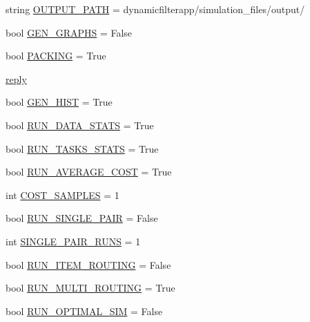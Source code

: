 \begin{DoxyCompactItemize}
string \mbox{\hyperlink{namespacedynamicfilterapp_1_1toggles_a04644ded1d5e3fc8bd58a411209b7886}{O\+U\+T\+P\+U\+T\+\_\+\+P\+A\+TH}} = \textquotesingle{}dynamicfilterapp/simulation\+\_\+files/output/\textquotesingle{}
\item 
bool \mbox{\hyperlink{namespacedynamicfilterapp_1_1toggles_a57c1e3f291181d680f3ee118fa5c4ab8}{G\+E\+N\+\_\+\+G\+R\+A\+P\+HS}} = False
\item 
bool \mbox{\hyperlink{namespacedynamicfilterapp_1_1toggles_a23735ccf05ebd9212e9ebaab8f652507}{P\+A\+C\+K\+I\+NG}} = True
\item 
\mbox{\hyperlink{namespacedynamicfilterapp_1_1toggles_a496267841b3ab9e872499fd2731736ff}{reply}}
\item 
bool \mbox{\hyperlink{namespacedynamicfilterapp_1_1toggles_a242327c0cdef5981d6e14793e1446957}{G\+E\+N\+\_\+\+H\+I\+ST}} = True
\item 
bool \mbox{\hyperlink{namespacedynamicfilterapp_1_1toggles_a36bc09bc8fbde0df2ea1c5d9ed0cf135}{R\+U\+N\+\_\+\+D\+A\+T\+A\+\_\+\+S\+T\+A\+TS}} = True
\item 
bool \mbox{\hyperlink{namespacedynamicfilterapp_1_1toggles_a70268a3d46d10702df56c16b2af24cc9}{R\+U\+N\+\_\+\+T\+A\+S\+K\+S\+\_\+\+S\+T\+A\+TS}} = True
\item 
bool \mbox{\hyperlink{namespacedynamicfilterapp_1_1toggles_a21f2f0f4c6df7faefb843dd318af3452}{R\+U\+N\+\_\+\+A\+V\+E\+R\+A\+G\+E\+\_\+\+C\+O\+ST}} = True
\item 
int \mbox{\hyperlink{namespacedynamicfilterapp_1_1toggles_a134ac33ad7706cd6a24fda5b63c73c65}{C\+O\+S\+T\+\_\+\+S\+A\+M\+P\+L\+ES}} = 1
\item 
bool \mbox{\hyperlink{namespacedynamicfilterapp_1_1toggles_ab61137c2de5f99b09789a6e76b7cda4c}{R\+U\+N\+\_\+\+S\+I\+N\+G\+L\+E\+\_\+\+P\+A\+IR}} = False
\item 
int \mbox{\hyperlink{namespacedynamicfilterapp_1_1toggles_a70d4dc65db288020e23ca213cd97c0f8}{S\+I\+N\+G\+L\+E\+\_\+\+P\+A\+I\+R\+\_\+\+R\+U\+NS}} = 1
\item 
bool \mbox{\hyperlink{namespacedynamicfilterapp_1_1toggles_a41d76408f27c5889dc3f40f066583a9f}{R\+U\+N\+\_\+\+I\+T\+E\+M\+\_\+\+R\+O\+U\+T\+I\+NG}} = False
\item 
bool \mbox{\hyperlink{namespacedynamicfilterapp_1_1toggles_a5f084acb116f3a65b90532f6a2ecb81b}{R\+U\+N\+\_\+\+M\+U\+L\+T\+I\+\_\+\+R\+O\+U\+T\+I\+NG}} = True
\item 
bool \mbox{\hyperlink{namespacedynamicfilterapp_1_1toggles_a82ca5524da03a0787588ac48df06bb1a}{R\+U\+N\+\_\+\+O\+P\+T\+I\+M\+A\+L\+\_\+\+S\+IM}} = False

\end{DoxyCompactItemize}
